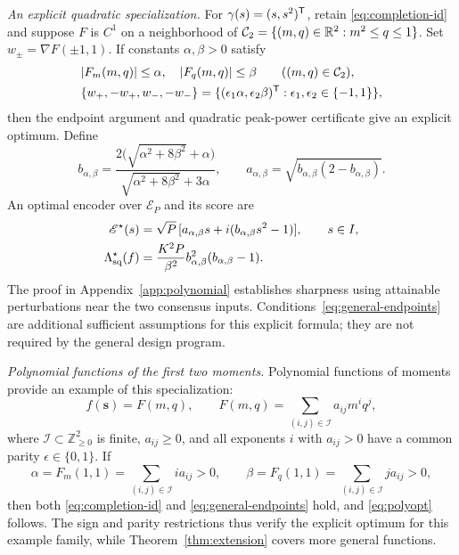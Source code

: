 \emph{An explicit quadratic specialization.} For $\gamma(s)=(s,s^2)^\mathsf T$, retain \eqref{eq:completion-id} and suppose $F$ is $C^1$ on a neighborhood of $\mathcal C_2=\{(m,q)\in\mathbb R^2:m^2\le q\le1\}$. Set $w_\pm=\nabla F(\pm1,1)$. If constants $\alpha,\beta>0$ satisfy
\begin{equation}
\begin{aligned}
 &|F_m(m,q)|\le\alpha,\quad |F_q(m,q)|\le\beta
       \qquad((m,q)\in\mathcal C_2),\\
 &\{w_+,-w_+,w_-,-w_-\}
   =\{(\epsilon_1\alpha,\epsilon_2\beta)^\mathsf T:\epsilon_1,\epsilon_2\in\{-1,1\}\},
\end{aligned}
 \label{eq:general-endpoints}
\end{equation}
then the endpoint argument and quadratic peak-power certificate give an explicit optimum. Define
$$
 b_{\alpha,\beta}
 =\frac{2\bigl(\sqrt{\alpha^2+8\beta^2}+\alpha\bigr)}
 {\sqrt{\alpha^2+8\beta^2}+3\alpha},\qquad
 a_{\alpha,\beta}=\sqrt{b_{\alpha,\beta}(2-b_{\alpha,\beta})}.
$$
An optimal encoder over $\mathcal E_P$ and its score are
\begin{equation}
\begin{aligned}
 \mathscr E^\star(s)&=\sqrt P\,[a_{\alpha,\beta}s+i(b_{\alpha,\beta}s^2-1)],\qquad s\in I,\\
 \Lambda_{\mathrm{sq}}^\star(f)&=\frac{K^2P}{\beta^2}
 b_{\alpha,\beta}^2(b_{\alpha,\beta}-1).
\end{aligned}
 \label{eq:polyopt}
\end{equation}
The proof in Appendix~\ref{app:polynomial} establishes sharpness using attainable perturbations near the two consensus inputs. Conditions~\eqref{eq:general-endpoints} are additional sufficient assumptions for this explicit formula; they are not required by the general design program.

\emph{Polynomial functions of the first two moments.} Polynomial functions of moments provide an example of this specialization:
\begin{equation}
 f(\mathbf s)=F(m,q),\qquad
 F(m,q)=\sum_{(i,j)\in\mathcal I}a_{ij}m^i q^j,
 \label{eq:polyclass}
\end{equation}
where $\mathcal I\subset\mathbb Z_{\ge0}^2$ is finite, $a_{ij}\ge0$, and all exponents $i$ with $a_{ij}>0$ have a common parity $\epsilon\in\{0,1\}$. If
$$
 \alpha=F_m(1,1)=\sum_{(i,j)\in\mathcal I}i a_{ij}>0,\qquad
 \beta=F_q(1,1)=\sum_{(i,j)\in\mathcal I}j a_{ij}>0,
$$
then both \eqref{eq:completion-id} and \eqref{eq:general-endpoints} hold, and \eqref{eq:polyopt} follows. The sign and parity restrictions thus verify the explicit optimum for this example family, while Theorem~\ref{thm:extension} covers more general functions.

